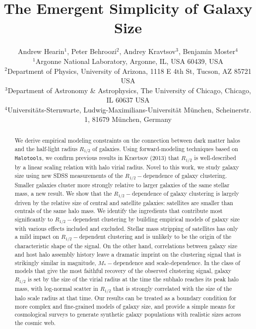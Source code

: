 \documentclass[usenatbib,usegraphicx,letterpaper]{mn2e}
\newcommand{\rhalf}{R_{1/2}}
\newcommand{\mstar}{M_{\ast}}
\begin{document}
\title[The Emergent Simplicity of Galaxy Size]
{The Emergent Simplicity of Galaxy Size}


\author[Hearin, Behroozi, Kravtsov \& Moster]{
Andrew Hearin$^{1}$, Peter Behroozi$^{2}$, Andrey Kravtsov$^{3}$, Benjamin Moster$^{4}$\\
$^{1}$Argonne National Laboratory, Argonne, IL, USA 60439, USA\\
$^{2}$Department of Physics, University of Arizona, 1118 E 4th St, Tucson, AZ 85721 USA\\
$^{3}$Department of Astronomy \& Astrophysics, The University of Chicago, Chicago, IL 60637 USA\\
$^{4}$Universit{\"a}ts-Sternwarte, Ludwig-Maximilians-Universit{\"a}t M{\"u}nchen, Scheinerstr. 1, 81679 M{\"u}nchen, Germany
}

\maketitle

\begin{abstract}
We derive empirical modeling constraints on the connection between dark matter halos and the half-light radius $\rhalf$ of galaxies. Using forward-modeling techniques based on {\tt Halotools}, we confirm previous results in Kravtsov (2013) that $\rhalf$ is well-described by a linear scaling relation with halo virial radius. Novel to this work, we study galaxy size using new SDSS measurements of the $\rhalf-$dependence of galaxy clustering. Smaller galaxies cluster more strongly relative to larger galaxies of the same stellar mass, a new result. We show that the $\rhalf-$dependence of galaxy clustering is largely driven by the relative size of central and satellite galaxies: satellites are smaller than centrals of the same halo mass. We identify the ingredients that contribute most significantly to $\rhalf-$dependent clustering by building empirical models of galaxy size with various effects included and excluded. Stellar mass stripping of satellites has only a mild impact on $\rhalf-$dependent clustering and is unlikely to be the origin of the characteristic shape of the signal. On the other hand, correlations between galaxy size and host halo assembly history leave a dramatic imprint on the clustering signal that is strikingly similar in magnitude, $\mstar-$dependence and scale-dependence. In the class of models that give the most faithful recovery of the observed clustering signal, galaxy $\rhalf$ is set by the size of the  virial radius at the time the subhalo reaches its peak halo mass, with log-normal scatter in $\rhalf$ that is strongly correlated with the size of the halo scale radius at that time. Our results can be treated as a boundary condition for more complex and fine-grained models of galaxy size, and provide a simple means for cosmological surveys to generate synthetic galaxy populations with realistic sizes across the cosmic web.
\end{abstract}
\end{document}
